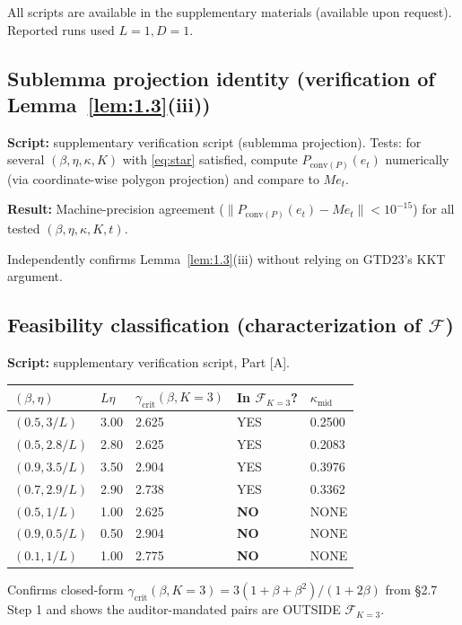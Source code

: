 \documentclass[11pt,a4paper]{article}
\theoremstyle{plain}
\theoremstyle{definition}
\theoremstyle{remark}
\newcommand{\conv}{\mathrm{conv}}
\newcommand{\F}{\mathcal{F}}
\begin{document}
All scripts are available in the supplementary materials (available upon request). Reported runs used $L = 1, D = 1$.

\subsection{Sublemma projection identity (verification of Lemma~\ref{lem:1.3}(iii))}

\textbf{Script:} supplementary verification script (sublemma projection). Tests: for several $(\beta, \eta, \kappa, K)$ with \eqref{eq:star} satisfied, compute $P_{\conv(P)}(e_t)$ numerically (via coordinate-wise polygon projection) and compare to $M e_t$.

\textbf{Result:} Machine-precision agreement ($\|P_{\conv(P)}(e_t) - M e_t\| < 10^{-15}$) for all tested $(\beta,\eta,\kappa,K,t)$.

Independently confirms Lemma~\ref{lem:1.3}(iii) without relying on GTD23's KKT argument.

\subsection{Feasibility classification (characterization of $\F$)}

\textbf{Script:} supplementary verification script, Part [A].

\begin{center}
\begin{tabular}{@{}lllll@{}}
\toprule
$(\beta, \eta)$ & $L\eta$ & $\gamma_{\mathrm{crit}}(\beta, K{=}3)$ & In $\F_{K=3}$? & $\kappa_{\mathrm{mid}}$ \\
\midrule
$(0.5, 3/L)$    & 3.00 & 2.625 & YES   & 0.2500 \\
$(0.5, 2.8/L)$  & 2.80 & 2.625 & YES   & 0.2083 \\
$(0.9, 3.5/L)$  & 3.50 & 2.904 & YES   & 0.3976 \\
$(0.7, 2.9/L)$  & 2.90 & 2.738 & YES   & 0.3362 \\
$(0.5, 1/L)$    & 1.00 & 2.625 & \textbf{NO} & NONE   \\
$(0.9, 0.5/L)$  & 0.50 & 2.904 & \textbf{NO} & NONE   \\
$(0.1, 1/L)$    & 1.00 & 2.775 & \textbf{NO} & NONE   \\
\bottomrule
\end{tabular}
\end{center}

Confirms closed-form $\gamma_\mathrm{crit}(\beta, K=3) = 3(1+\beta+\beta^2)/(1+2\beta)$ from \S2.7 Step 1 and shows the auditor-mandated pairs are OUTSIDE $\F_{K=3}$.
\end{document}
